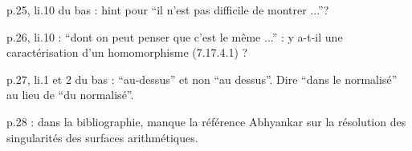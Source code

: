 
p.25, li.10 du bas : hint pour ``il n'est pas difficile de montrer ...''?

p.26, li.10 : ``dont on peut penser que c'est le même ...'' : y a-t-il  une caractérisation d'un homomorphisme (7.17.4.1) ? 

p.27, li.1 et 2 du bas : ``au-dessus'' et non ``au dessus''. Dire ``dans le normalisé'' au lieu de ``du normalisé''.

p.28 : dans la bibliographie, manque la référence Abhyankar sur la résolution des singularités des surfaces arithmétiques.


